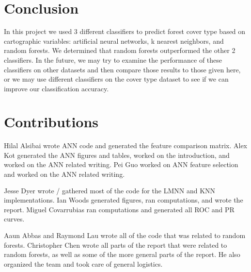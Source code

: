 \documentclass[12pt]{article}
\begin{document}
\section{Conclusion}
In this project we used 3 different classifiers to predict forest cover type based on cartographic variables: artificial neural networks, k nearest neighbors, and random forests. We determined that random forests outperformed the other 2 classifiers. In the future, we may try to examine the performance of these classifiers on other datasets and then compare those results to those given here, or we may use different classifiers on the cover type dataset to see if we can improve our classification accuracy.

\section{Contributions}
\paragraph{}

Hilal Alsibai wrote ANN code and generated the feature comparison matrix. Alex Kot generated the ANN figures and tables, worked on the introduction, and worked on the ANN related writing. Pei Guo worked on ANN feature selection and worked on the ANN related writing.
\par
Jesse Dyer wrote / gathered most of the code for the LMNN and KNN implementations. Ian Woods generated figures, ran computations, and wrote the report. Miguel Covarrubias ran computations and generated all ROC and PR curves.
\par
Aaun Abbas and Raymond Lau wrote all of the code that was related to random forests. Christopher Chen wrote all parts of the report that were related to random forests, as well as some of the more general parts of the report. He also organized the team and took care of general logistics.
\end{document}
